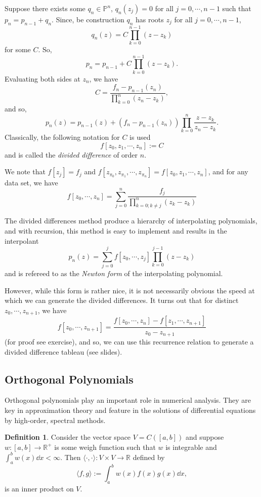 \documentclass[
]{article}
\theoremstyle{definition}
\theoremstyle{definition}
\newtheorem{definition}{Definition}[section]
\begin{document}
Suppose there exists some \(q_n \in \mathbb{P}^n\), \(q_n(z_j) = 0\) for
all \(j = 0, \cdots, n - 1\) such that \(p_n = p_{n - 1} + q_n\). Since,
be construction \(q_n\) has roots \(z_j\) for all
\(j = 0, \cdots, n - 1\), \[q_n(z) = C\prod_{k = 0}^{n - 1}(z - z_k)\]
for some \(C\). So,
\[p_n = p_{n - 1} + C\prod_{k = 0}^{n - 1}(z - z_k).\] Evaluating both
sides at \(z_n\), we have
\[C = \frac{f_n - p_{n - 1}(z_n)}{\prod_{k = 0}^n(z_n - z_k)},\] and so,
\[p_n(z) = p_{n - 1}(z) + (f_n - p_{n - 1}(z_n))\prod_{k = 0}^n\frac{z - z_k}{z_n - z_k}.\]
Classically, the following notation for \(C\) is used
\[f[z_0, z_1, \cdots, z_n] := C\] and is called the \emph{divided
difference} of order \(n\).

We note that \(f[z_j] = f_j\) and
\(f[z_{\pi_0}, z_{\pi_1}, \cdots, z_{\pi_n}] = f[z_0, z_1, \cdots, z_n]\),
and for any data set, we have
\[f[z_0, \cdots, z_n] = \sum_{j = 0}^n\frac{f_j}{\prod_{k = 0; k \neq j}^n(z_k - z_k)}\]

The divided differences method produce a hierarchy of interpolating
polynomials, and with recursion, this method is easy to implement and
results in the interpolant
\[p_n(z) = \sum_{j = 0}^j f[z_0, \cdots, z_j] \prod_{k = 0}^{j - 1}(z - z_k)\]
and is refereed to as the \emph{Newton form} of the interpolating
polynomial.

However, while this form is rather nice, it is not necessarily obvious
the speed at which we can generate the divided differences. It turns out
that for distinct \(z_0, \cdots, z_{n + 1}\), we have
\[f[z_0, \cdots, z_{n + 1}] = \frac{f[z_0, \cdots, z_n] - f[z_1, \cdots, z_{n + 1}]}
  {z_0 - z_{n + 1}}\] (for proof see exercise), and so, we can use this
recurrence relation to generate a divided difference tableau (see
slides).

\hypertarget{orthogonal-polynomials}{%
\subsection{Orthogonal Polynomials}\label{orthogonal-polynomials}}

Orthogonal polynomials play an important role in numerical analysis.
They are key in approximation theory and feature in the solutions of
differential equations by high-order, spectral methods.

\begin{definition}
  Consider the vector space \(V = C([a, b])\) and suppose \(w : [a, b] \to \mathbb{R}^+\)
  is some weigh function such that \(w\) is integrable and 
  \(\int_a^b w(x) \dd x < \infty\). Then \(\langle \cdot, \cdot \rangle : V \times V \to \mathbb{R}\) 
  defined by 
  \[\langle f, g \rangle := \int_a^b w(x) f(x) g(x) \dd x,\]
  is an inner product on \(V\).
\end{definition}
\end{document}
